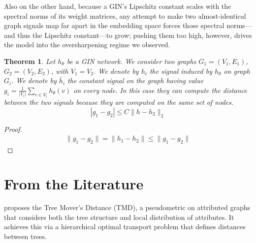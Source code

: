 \documentclass[11pt]{article}\usepackage{amsmath,amssymb,amsthm,bbm}
\newtheorem{theorem}{Theorem}
\newcommand{\1}{\mathbbm{1}}
\begin{document}
Also on the other hand, because a GIN’s Lipschitz constant scales with the spectral norms of its weight matrices, any attempt to make two almost-identical graph signals map far apart in the embedding space forces those spectral norms—and thus the Lipschitz constant—to grow; pushing them too high, however, drives the model into the oversharpening regime we observed.



\begin{theorem}
      Let $ h_{\theta} $ be a GIN network. We consider two graphs $G_1 = (V_1, E_1) $, $G_2 = (V_2, E_2) $, with $ V_1 = V_2 $.
   We denote by \( h_i \) the signal induced by $h_{\theta}$ on graph $G_i$. 
We denote by \(\bar{h}_i \) the constant signal on the graph having value \( g_i = \frac{1}{|V_i|}\sum_{v \in V_i} h_{\theta}(v) \) on every node. In this case they can compute the distance between the two signals because they are computed on the same set of nodes. 
\[ |g_1 - g_2| \le C \| h - h_2\|_{2} \]
\end{theorem}
\begin{proof}
    \begin{align}
    \| g_1 - g_2 \| =  \| h_1 - h_2 \| \leq  \| g_1 - g_2 \|
    \end{align}
\end{proof}


\section{From the Literature}

\cite{chuang2022tree} proposes the Tree Mover’s Distance (TMD), a pseudometric on attributed graphs that
considers both the tree structure and local distribution of attributes. It achieves this via a hierarchical
optimal transport problem that defines distances between trees.
\end{document}
